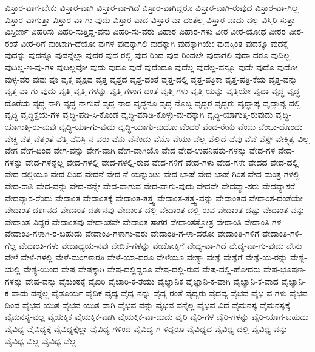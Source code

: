 {ವಿಸ್ತಾರ-ವಾಗ-ಬೇಕು
ವಿಸ್ತಾರ-ವಾಗಿ
ವಿಸ್ತಾರ-ವಾ-ಗಿದೆ
ವಿಸ್ತಾರ-ವಾಗಿದ್ದರೂ
ವಿಸ್ತಾರ-ವಾಗಿ-ರುವುದ
ವಿಸ್ತಾರ-ವಾ-ಗಿಲ್ಲ
ವಿಸ್ತಾರ-ವಾಗುತ್ತಾ
ವಿಸ್ತಾರ-ವಾ-ಗು-ವುದು
ವಿಸ್ತಾರ-ವಾದ
ವಿಸ್ತಾರ-ವಾ-ದಂತೆಲ್ಲ
ವಿಸ್ತಾರ-ವಾದು-ದಲ್ಲ
ವಿಸ್ತಿರಿ-ಸುತ್ತಾ
ವಿಸ್ತೀರ್ಣ
ವಿಹರಿಸು
ವಿಹರಿ-ಸುತ್ತಿದ್ದ-ವನು
ವಿಹರಿ-ಸು-ವರು
ವಿಹಾರ
ವಿಹಾರ-ಗಳು
ವೀರ
ವೀರ-ಯೋಧ
ವೀರರ
ವೀರ-ರಂತೆ
ವೀರ-ರಿಗೆ
ವುಂಟಾಗಿ-ದೆಯೋ
ವುಗಳ
ವುದಕ್ಕಾಗಲಿ
ವುದಕ್ಕಾಗಿ
ವುದಕ್ಕಾಗಿಯೇ
ವುದಕ್ಕಿಂತ
ವುದಕ್ಕೂ
ವುದಕ್ಕೆ
ವುದನ್ನು
ವುದನ್ನೂ
ವುದನ್ನೆಲ್ಲಾ
ವುದರ
ವುದ-ರಲ್ಲಿ
ವುದ-ರಿಂದ
ವುದ-ರಿಂದಲೇ
ವುದಾಗಲಿ
ವುದಾ-ದರೂ
ವುದಿಲ್ಲ
ವುದಿಲ್ಲ-ಇ-ವು-ಗಳ
ವುದಿಲ್ಲವೋ
ವುದು
ವುದೂ
ವುದೆ
ವುದೆಂದೂ
ವುದೆಲ್ಲ
ವುದೆಲ್ಲ-ವನ್ನೂ
ವುದೇ
ವುದೊ
ವುದೋ
ವುಳ್ಳ-ವರ
ವುವು
ವೂ
ವೃಕ್ಷ
ವೃಕ್ಷದ
ವೃತ್ತ
ವೃತ್ತದ
ವೃತ್ತ-ದಂತೆ
ವೃತ್ತ-ದಲ್ಲಿ
ವೃತ್ತ-ಪತ್ರಿಕಾ
ವೃತ್ತ-ಪತ್ರಿ-ಕೆಯ
ವೃತ್ತ-ವನ್ನು
ವೃತ್ತ-ವಾ-ಗು-ವುದು
ವೃತ್ತಿ
ವೃತ್ತಿ-ಗಳನ್ನು
ವೃತ್ತಿ-ಗಳಾಗ-ದಂತೆ
ವೃತ್ತಿ-ಗಳು
ವೃತ್ತಿ-ಯನ್ನು
ವೃತ್ತಿಯೇ
ವೃಥಾ
ವೃದ್ಧ
ವೃದ್ಧ-ದೊರೆಯ
ವೃದ್ಧ-ನಾಗಿ
ವೃದ್ಧ-ನಾಗುವೆ
ವೃದ್ಧ-ನಾದ
ವೃದ್ಧನೂ
ವೃದ್ಧ-ನೊಬ್ಬ
ವೃದ್ಧರ
ವೃದ್ಧರು
ವೃದ್ಧಾಪ್ಯ
ವೃದ್ಧಾಪ್ಯ-ದಲ್ಲಿ
ವೃದ್ಧಿ
ವೃದ್ಧಿಕ್ಷಯ-ಗಳ
ವೃದ್ಧಿ-ಪಡಿ-ಸಿ-ಕೊಂಡ
ವೃದ್ಧಿ-ಮಾಡಿ-ಕೊಳ್ಳು-ವು-ದಕ್ಕಾಗಿ
ವೃದ್ಧಿ-ಯಾಗುತ್ತಿ-ರುವುದು
ವೃದ್ಧಿ-ಯಾಗುತ್ತಿ-ರು-ವುವು
ವೃದ್ಧಿ-ಯಾ-ಗು-ವುದು
ವೃದ್ಧಿ-ಯಾಗು-ವುದೋ
ವೆಂದರೆ
ವೆಂದ-ರೇನು
ವೆಂದು
ವೆಂಬು-ದೊಂದು
ವೆಚ್ಚ
ವೆತ್ತ
ವೆತ್ತಂತೆ
ವೆತ್ತಿ
ವೆನಿಸ್ಸಿ-ನ-ವರು
ವೆನು
ವೆನೆಂದು
ವೆನೊ
ವೆಯಾ
ವೆಲ್ಲ
ವೆಲ್ಲಿದೆ
ವೆವು
ವೆವೆ
ವೆಸ್ಟ್
ವೇಕ್ತ್ತಿತ್ವ-ವಿಲ್ಲ
ವೇಗ
ವೇಗ-ದಿಂದ
ವೇಗ-ವನ್ನು
ವೇಗ-ವಾಗಿ
ವೇಗ-ವಾಗಿಯೊ
ವೇದ
ವೇದ-ಉಪನಿಷತು-ಗಳನ್ನು
ವೇದ-ಗಳ
ವೇದ-ಗಳನ್ನು
ವೇದ-ಗಳನ್ನೆಲ್ಲ
ವೇದ-ಗಳಲ್ಲಿ
ವೇದ-ಗಳಲ್ಲಿ-ರುವ
ವೇದ-ಗಳಿಗೆ
ವೇದ-ಗಳು
ವೇದ-ಗಳೇ
ವೇದದ
ವೇದ-ದಲ್ಲಿ
ವೇದ-ದಲ್ಲಿಯೂ
ವೇದ-ದಿಂದ
ವೇದನೆ
ವೇದ-ನೆ-ಯನ್ನುಂಟು
ವೇದ-ಭಾಷೆ
ವೇದ-ಭಾಷೆ-ಗಿಂತ
ವೇದ-ಮಂತ್ರ-ಗಳಲ್ಲಿ
ವೇದ-ರಾಶಿ
ವೇದ-ವನ್ನು
ವೇದ-ವನ್ನೇ
ವೇದ-ವಾಗುವ
ವೇದ-ವಾಗು-ವುದು
ವೇದವೇ
ವೇದವ್ಯಾ-ಸರು
ವೇದವ್ಯಾಸರೆ
ವೇದವ್ಯಾಸ-ರೆಂದು
ವೇದಾಂತ
ವೇದಾಂತಕ್ಕೆ
ವೇದಾಂತ-ತತ್ತ್ವ
ವೇದಾಂತ-ತತ್ತ್ವ-ವನ್ನು
ವೇದಾಂತದ
ವೇದಾಂತ-ದಂತೆಯೇ
ವೇದಾಂತ-ದರ್ಶನದ
ವೇದಾಂತ-ದರ್ಶನವು
ವೇದಾಂತ-ದಲ್ಲಿ
ವೇದಾಂತ-ದಲ್ಲಿ-ರುವ
ವೇದಾಂತ-ದಷ್ಟು
ವೇದಾಂತ-ವನ್ನು
ವೇದಾಂತ-ವಿದ್ದರೆ
ವೇದಾಂತವು
ವೇದಾಂತವೇ
ವೇದಾಂತ-ಸಾಗರ
ವೇದಾಂತಸ್ತೋತ್ರ
ವೇದಾಂತಿ
ವೇದಾಂತಿ-ಗಳ
ವೇದಾಂತಿ-ಗಳಾಗಿ-ರ-ಬಹುದು
ವೇದಾಂತಿ-ಗಳಾಗು-ವರು
ವೇದಾಂತಿ-ಗ-ಳಾ-ದರೋ
ವೇದಾಂತಿ-ಗಳಿಗೆ
ವೇದಾಂತಿ-ಗಳಿ-ಗೆಲ್ಲ
ವೇದಾಂತಿ-ಗಳು
ವೇದಾಧ್ಯಯ-ನವು
ವೇದಿಕೆ-ಗಳನ್ನು
ವೇದೋಕ್ತಿಗೆ
ವೇದ್ಯ-ವಾ-ಗಿದೆ
ವೇದ್ಯ-ವಾ-ಗು-ವುದು
ವೇನು
ವೇಳೆ
ವೇಳೆ-ಗಳಲ್ಲಿ
ವೇಳೆ-ಮಂಗಳಾರತಿ
ವೇಳೆ-ಯಾ-ದರೂ
ವೇಳೆಯೂ
ವೇಶ್ಯಾ
ವೇಶ್ಯೆ
ವೇಶ್ಯೆಗೆ
ವೇಶ್ಯೆ-ಯ-ರನ್ನು
ವೇಶ್ಯೆ-ಯಲ್ಲಿ
ವೇಶ್ಯೆ-ಯಿಂದ
ವೇಷ
ವೇಷಕ್ಕಾಗಿ
ವೇಷ-ದಲ್ಲಿದ್ದರೂ
ವೇಷ-ದಲ್ಲಿ-ರುವ
ವೇಷ-ದಲ್ಲಿ-ಹೋದರು
ವೇಷ-ಭೂಷಣ-ಗಳನ್ನು
ವೇಷ-ವನ್ನು
ವೈಕುಂಠಕ್ಕೆ
ವೈಖರಿ
ವೈಚಾರಿ-ಕ-ತೆಯು
ವೈಜ್ಞಾನಿಕ
ವೈಜ್ಞಾನಿ-ಕ-ವಾಗಿ
ವೈಜ್ಞಾನಿ-ಕ-ವಾದ
ವೈಜ್ಞಾನಿ-ಕ-ವಾದು-ದನ್ನೆಲ್ಲ
ವೈಢೂರ್ಯ
ವೈದಿಕ
ವೈದ್ಯ
ವೈದ್ಯ-ನನ್ನು
ವೈದ್ಯ-ರಂತೆ
ವೈದ್ಯರು
ವೈಧವ್ಯ
ವೈಭವ
ವೈಭ-ವ-ಗಳು
ವೈಭವ-ದಿಂದ
ವೈಭವ-ಯುತ
ವೈಭವ-ಯುತ-ವಾಗಿ
ವೈಭವ-ವನ್ನು
ವೈಭವ-ವನ್ನೆಲ್ಲ
ವೈಭವ-ವಿದೆ
ವೈಮನಸ್ಯ
ವೈಮನಸ್ಯಕ್ಕೆ
ವೈಮನಸ್ಯ-ವಲ್ಲ
ವೈಯಕ್ತಿಕ
ವೈಯಕ್ತಿಕ-ವಾಗಿ
ವೈಯಕ್ತಿಕ-ವಾ-ದುದು
ವೈರಿ
ವೈರಿ-ಗಳ
ವೈರಿ-ಗಳನ್ನು
ವೈರಿ-ಯಾಗ-ಬಹುದು
ವೈವಿಧ್ಯ
ವೈವಿಧ್ಯಕ್ಕೆ
ವೈವಿಧ್ಯಕ್ಕೆಲ್ಲಾ
ವೈವಿಧ್ಯ-ಗಳಿಂದ
ವೈವಿಧ್ಯ-ಗ-ಳಿದ್ದರೂ
ವೈವಿಧ್ಯದ
ವೈವಿಧ್ಯ-ದಲ್ಲಿ
ವೈವಿಧ್ಯ-ವನ್ನು
ವೈವಿಧ್ಯ-ವಿಲ್ಲ
ವೈವಿಧ್ಯ-ವೆಲ್ಲ
}
